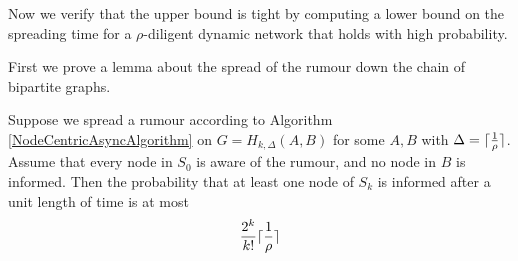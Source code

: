 Now we verify that the upper bound is tight by computing a lower bound on the spreading time for a $\rho$-diligent dynamic network that holds with high probability.

First we prove a lemma about the spread of the rumour down the chain of bipartite graphs.

\begin{lemma}\label{lemma:H_k,DeltaABOneStep}
	Suppose we spread a rumour according to Algorithm \ref{NodeCentricAsyncAlgorithm} on $G = H_{k, \Delta}(A,B)$ for some $A, B$ with $\Delta = \lceil\frac{1}{\rho}\rceil$. Assume that every node in $S_0$ is aware of the rumour, and no node in $B$ is informed. Then the probability that at least one node of $S_k$ is informed after a unit length of time is at most
	$$
		\frac{2^k}{k!}\lceil\frac{1}{\rho}\rceil
	$$	
\end{lemma}

